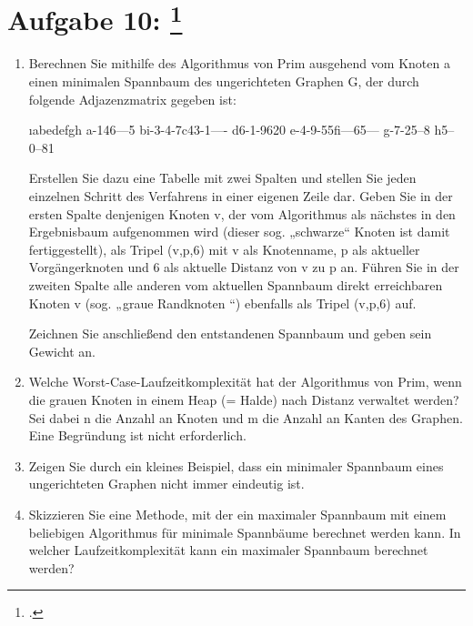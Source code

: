 \documentclass{lehramt-informatik-aufgabe}
\begin{document}
\liAufgabenTitel{}
\section{Aufgabe 10:
\footcite{66115:2018:03}}
\begin{enumerate}


\item Berechnen Sie mithilfe des Algorithmus von Prim ausgehend vom
Knoten a einen minimalen Spannbaum des ungerichteten Graphen G, der
durch folgende Adjazenzmatrix gegeben ist:

ıabedefgh
a-146---5
bi-3-4-7c43-1----
d6-1-9620
e-4-9-55fi---65---
g-7-25--8
h5--0--81

Erstellen Sie dazu eine Tabelle mit zwei Spalten und stellen Sie jeden
einzelnen Schritt des Verfahrens in einer eigenen Zeile dar. Geben Sie
in der ersten Spalte denjenigen Knoten v, der vom Algorithmus als
nächstes in den Ergebnisbaum aufgenommen wird (dieser sog. „schwarze“
Knoten ist damit fertiggestellt), als Tripel (v,p,6) mit v als
Knotenname, p als aktueller Vorgängerknoten und 6 als aktuelle Distanz
von v zu p an. Führen Sie in der zweiten Spalte alle anderen vom
aktuellen Spannbaum direkt erreichbaren Knoten v (sog. „graue Randknoten
“) ebenfalls als Tripel (v,p,6) auf.

Zeichnen Sie anschließend den entstandenen Spannbaum und geben sein
Gewicht an.


\item Welche Worst-Case-Laufzeitkomplexität hat der Algorithmus von
Prim, wenn die grauen Knoten in einem Heap (= Halde) nach Distanz
verwaltet werden? Sei dabei n die Anzahl an Knoten und m die Anzahl an
Kanten des Graphen. Eine Begründung ist nicht erforderlich.


\item Zeigen Sie durch ein kleines Beispiel, dass ein minimaler
Spannbaum eines ungerichteten Graphen nicht immer eindeutig ist.


\item Skizzieren Sie eine Methode, mit der ein maximaler Spannbaum mit
einem beliebigen Algorithmus für minimale Spannbäume berechnet werden
kann. In welcher Laufzeitkomplexität kann ein maximaler Spannbaum
berechnet werden?
\end{enumerate}
\end{document}
